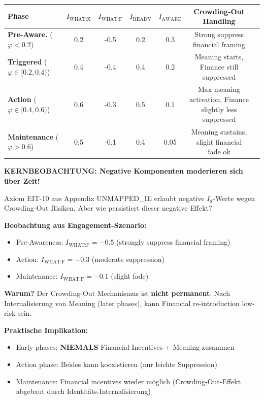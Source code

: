 \begin{center}
\small
\renewcommand{\arraystretch}{1.3}
\begin{tabular}{@{}lcccccc@{}}
\toprule
\textbf{Phase} & $I_{\text{WHAT:X}}$ & $I_{\text{WHAT:F}}$ & $I_{\text{READY}}$ & $I_{\text{AWARE}}$ & \textbf{Crowding-Out Handling} \\
\midrule
\textbf{Pre-Aware.} ($\varphi < 0.2$) & 0.2 & -0.5 & 0.2 & 0.3 & Strong suppress financial framing \\
\textbf{Triggered} ($\varphi \in [0.2, 0.4)$) & 0.4 & -0.4 & 0.4 & 0.2 & Meaning starts, Finance still suppressed \\
\textbf{Action} ($\varphi \in [0.4, 0.6)$) & 0.6 & -0.3 & 0.5 & 0.1 & Max meaning activation, Finance slightly less suppressed \\
\textbf{Maintenance} ($\varphi > 0.6$) & 0.5 & -0.1 & 0.4 & 0.05 & Meaning sustains, slight financial fade ok \\
\bottomrule
\end{tabular}
\end{center}

\textbf{KERNBEOBACHTUNG: Negative Komponenten moderieren sich über Zeit!}

\begin{tcolorbox}[colback=orange!5!white, colframe=orange!75!black, title=\textbf{Axiom-Bezug: EIT-10 über Phasen (Neu!)}]

Axiom EIT-10 aus Appendix UNMAPPED_IE erlaubt negative $I_d$-Werte wegen Crowding-Out Risiken. Aber wie persistiert dieser negative Effekt?

\textbf{Beobachtung aus Engagement-Szenario:}
\begin{itemize}[nosep]
\item Pre-Awareness: $I_{\text{WHAT:F}} = -0.5$ (strongly suppress financial framing)
\item Action: $I_{\text{WHAT:F}} = -0.3$ (moderate suppression)
\item Maintenance: $I_{\text{WHAT:F}} = -0.1$ (slight fade)
\end{itemize}

\textbf{Warum?} Der Crowding-Out Mechanismus ist \textbf{nicht permanent}. Nach Internalisierung von Meaning (later phases), kann Financial re-introduction low-risk sein.

\textbf{Praktische Implikation:}
\begin{itemize}[nosep]
\item Early phases: \textbf{NIEMALS} Financial Incentives + Meaning zusammen
\item Action phase: Beides kann koexistieren (nur leichte Suppression)
\item Maintenance: Financial incentives wieder möglich (Crowding-Out-Effekt abgebaut durch Identitäts-Internalisierung)
\end{itemize}

\end{tcolorbox}


